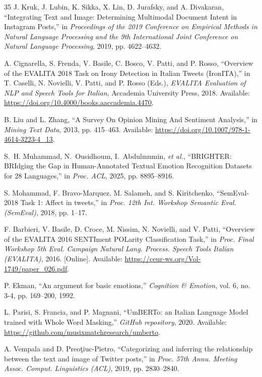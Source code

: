 \documentclass[letterpaper,journal]{IEEEtran}
\begin{document}
\begin{thebibliography}{35}
 J. Kruk, J. Lubin, K. Sikka, X. Lin, D. Jurafsky, and A. Divakaran, ``Integrating Text and Image: Determining Multimodal Document Intent in Instagram Posts,'' in \textit{Proceedings of the 2019 Conference on Empirical Methods in Natural Language Processing and the 9th International Joint Conference on Natural Language Processing}, 2019, pp. 4622--4632.

 A. Cignarella, S. Frenda, V. Basile, C. Bosco, V. Patti, and P. Rosso, ``Overview of the EVALITA 2018 Task on Irony Detection in Italian Tweets (IronITA),'' in T. Caselli, N. Novielli, V. Patti, and P. Rosso (Eds.), \textit{EVALITA Evaluation of NLP and Speech Tools for Italian}, Accademia University Press, 2018. Available: \url{https://doi.org/10.4000/books.aaccademia.4470}.

 B. Liu and L. Zhang, ``A Survey On Opinion Mining And Sentiment Analysis,'' in \textit{Mining Text Data}, 2013, pp. 415--463. Available: \url{https://doi.org/10.1007/978-1-4614-3223-4_13}.

 S.~H. Muhammad, N.~Ousidhoum, I.~Abdulmumin, \textit{et al.}, ``BRIGHTER: BRIdging the Gap in Human-Annotated Textual Emotion Recognition Datasets for 28 Languages,'' in \textit{Proc. ACL}, 2025, pp. 8895--8916.

 S. Mohammad, F. Bravo-Marquez, M. Salameh, and S. Kiritchenko, ``SemEval-2018 Task 1: Affect in tweets,'' in \textit{Proc. 12th Int. Workshop Semantic Eval. (SemEval)}, 2018, pp. 1--17.

 F. Barbieri, V. Basile, D. Croce, M. Nissim, N. Novielli, and V. Patti, ``Overview of the EVALITA 2016 SENTIment POLarity Classification Task,'' in \textit{Proc. Final Workshop 5th Eval. Campaign Natural Lang. Process. Speech Tools Italian (EVALITA)}, 2016. [Online]. Available: \url{https://ceur-ws.org/Vol-1749/paper_026.pdf}.

 P. Ekman, ``An argument for basic emotions,'' \textit{Cognition \& Emotion}, vol. 6, no. 3-4, pp. 169--200, 1992.

 L. Parisi, S. Francia, and P. Magnani, ``UmBERTo: an Italian Language Model trained with Whole Word Masking,'' \textit{GitHub repository}, 2020. Available: \url{https://github.com/musixmatchresearch/umberto}.

 A. Vempala and D. Preo\c{t}iuc-Pietro, ``Categorizing and inferring the relationship between the text and image of Twitter posts,'' in \textit{Proc. 57th Annu. Meeting Assoc. Comput. Linguistics (ACL)}, 2019, pp. 2830--2840.


\end{thebibliography}
\end{document}
